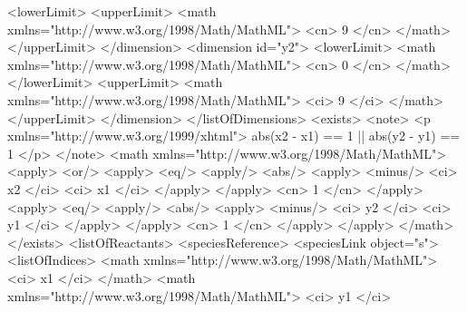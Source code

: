 \documentclass{cekarticle}
\begin{document}
\begin{example}
                    <lowerLimit>
                    <upperLimit>
                        <math xmlns="http://www.w3.org/1998/Math/MathML">
                            <cn> 9 </cn>
                        </math>
                    </upperLimit>
                </dimension>
                <dimension id="y2">
                    <lowerLimit>
                        <math xmlns="http://www.w3.org/1998/Math/MathML">
                            <cn> 0 </cn>
                        </math>
                    </lowerLimit>
                    <upperLimit>
                        <math xmlns="http://www.w3.org/1998/Math/MathML">
                            <ci> 9 </ci>
                        </math>
                    </upperLimit>
                </dimension>
            </listOfDimensions>
            <exists>
                <note>
                    <p xmlns="http://www.w3.org/1999/xhtml">
                        abs(x2 - x1) == 1 || abs(y2 - y1) == 1
                    </p>
                </note>                
                <math xmlns="http://www.w3.org/1998/Math/MathML">
                    <apply>
                        <or/>
                        <apply>
                            <eq/>
                            <apply/>
                                <abs/>
                                <apply>
                                    <minus/>
                                    <ci> x2 </ci>
                                    <ci> x1 </ci>
                                </apply>
                            </apply>
                            <cn> 1 </cn>
                        </apply>
                        <apply>
                            <eq/>
                            <apply/>
                                <abs/>
                                <apply>
                                    <minus/>
                                    <ci> y2 </ci>
                                    <ci> y1 </ci>
                                </apply>
                            </apply>
                            <cn> 1 </cn>
                        </apply>
                    </apply>
                </math>
            </exists>
            <listOfReactants>
                <speciesReference>
                    <speciesLink object="s">
                        <listOfIndices>
                            <math xmlns="http://www.w3.org/1998/Math/MathML">
                                <ci> x1 </ci>
                            </math>
                            <math xmlns="http://www.w3.org/1998/Math/MathML">
                                <ci> y1 </ci>

\end{example}
\end{document}

